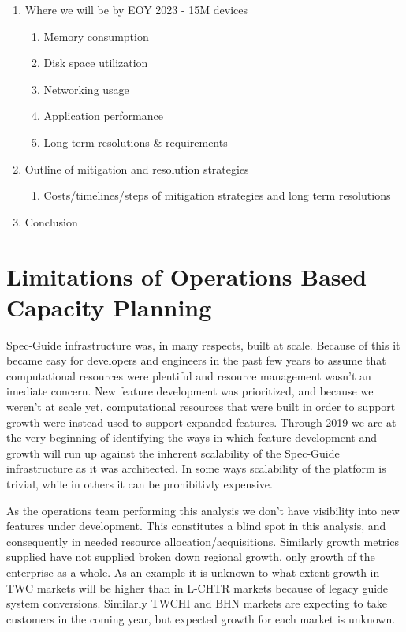 \documentclass{article}
\begin{document}
\begin{enumerate}
\item Where we will be by EOY 2023 - 15M devices
  \begin{enumerate}
  \item ​Memory consumption
  \item Disk space utilization
  \item Networking usage
  \item Application performance​
  \item Long term resolutions \& requirements
  \end{enumerate}
\item Outline of mitigation and resolution strategies
  \begin{enumerate}
  \item Costs/timelines/steps of mitigation strategies and long term resolutions
  \end{enumerate}
\item Conclusion
\end{enumerate}



\newpage

\section{Limitations of Operations Based Capacity Planning}
\label{SECTION-Limitations}

Spec-Guide infrastructure was, in many respects, built at scale. Because of this it became easy for developers and engineers in the past few years to assume that computational resources were plentiful and resource management wasn't an imediate concern. New feature development was prioritized, and because we weren't at scale yet, computational resources that were built in order to support growth were instead used to support expanded features. Through 2019 we are at the very beginning of identifying the ways in which feature development and growth will run up against the inherent scalability of the Spec-Guide infrastructure as it was architected. In some ways scalability of the platform is trivial, while in others it can be prohibitivly expensive. 

As the operations team performing this analysis we don't have visibility into new features under development. This constitutes a blind spot in this analysis, and consequently in needed resource allocation/acquisitions. Similarly growth metrics supplied have not supplied broken down regional growth, only growth of the enterprise as a whole. As an example it is unknown to what extent growth in TWC markets will be higher than in L-CHTR markets because of legacy guide system conversions. Similarly TWCHI and BHN markets are expecting to take customers in the coming year, but expected growth for each market is unknown. 
\end{document}
